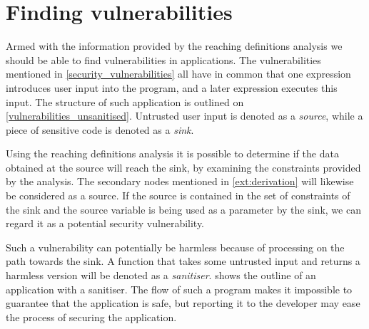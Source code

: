 \section{Finding vulnerabilities}\label{theory_finding_vulns}
Armed with the information provided by the reaching definitions analysis we should be able to find vulnerabilities in applications.
The vulnerabilities mentioned in \cref{security_vulnerabilities} all have in common that one expression introduces user input into the program, and a later expression executes this input.
The structure of such application is outlined on \cref{vulnerabilities_unsanitised}.
Untrusted user input is denoted as a \emph{source}, while a piece of sensitive code is denoted as a \emph{sink}.

Using the reaching definitions analysis it is possible to determine if the data obtained at the source will reach the sink, by examining the constraints provided by the analysis.
The secondary nodes mentioned in \cref{ext:derivation} will likewise be considered as a source.
If the source is contained in the set of constraints of the sink and the source variable is being used as a parameter by the sink, we can regard it as a potential security vulnerability.

Such a vulnerability can potentially be harmless because of processing on the path towards the sink.
A function that takes some untrusted input and returns a harmless version will be denoted as a \emph{sanitiser}.
 shows the outline of an application with a sanitiser.
The flow of such a program makes it impossible to guarantee that the application is safe, but reporting it to the developer may ease the process of securing the application.

